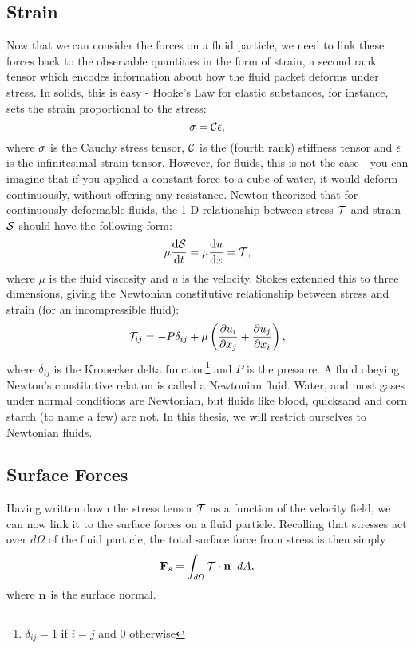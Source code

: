 \subsection{Strain}
Now that we can consider the forces on a fluid particle, we need to link these forces back to the observable quantities in the form of strain, a second rank tensor which encodes information about how the fluid packet deforms under stress. In solids, this is easy - Hooke's Law for elastic substances, for instance, sets the strain proportional to the stress:
\begin{equation}
\mathbf{\sigma} = \mathcal{C}\mathbf{\epsilon},
\end{equation}
where $\mathbf{\sigma}$ is the Cauchy stress tensor, $\mathcal{C}$ is the (fourth rank) stiffness tensor and $\mathbf{\epsilon}$ is the infinitesimal strain tensor. However, for fluids, this is not the case - you can imagine that if you applied a constant force to a cube of water, it would deform continuously, without offering any resistance. Newton theorized that for continuously deformable fluids, the 1-D relationship between stress $\mathcal{T}$ and strain $\mathcal{S}$ should have the following form:
\begin{equation}
\mu \der{1}{\Tensor{S}}{t} = \mu \der{1}{u}{x}=\Tensor{T}, 
\end{equation}
where $\mu$ is the fluid viscosity and $u$ is the velocity.  Stokes extended this to three dimensions, giving the Newtonian constitutive relationship between stress and strain (for an incompressible fluid):
\begin{equation}\label{eq:constitutive}
\Tensor{T}_{ij} = -P\delta_{ij} + \mu\paren{\pder{1}{u_{i}}{x_j} + \pder{1}{u_j}{x_i}},
\end{equation}
where $\delta_{ij}$ is the Kronecker delta function\footnote{$\delta_{ij} = 1$ if $i=j$ and $0$ otherwise} and $P$ is the pressure. A fluid obeying Newton's constitutive relation is called a Newtonian fluid. Water, and most gases under normal conditions are Newtonian, but fluids like blood, quicksand and corn starch (to name a few) are not. In this thesis, we will restrict ourselves to Newtonian fluids.

\subsection{Surface Forces}
Having written down the stress tensor $\mathcal{T}$ as a function of the velocity field, we can now link it to the surface forces on a fluid particle. Recalling that stresses act over $d\Omega$ of the fluid particle, the total surface force from stress is then simply 
\begin{equation}\label{eq:surfaceForce}
\Vector{F}_s = \int{d\Omega}{}{\Tensor{T}\cdot\Vector{n}}{dA},
\end{equation}
where $\mathbf{n}$ is the surface normal. 

